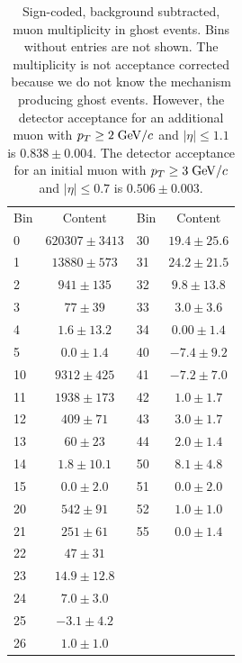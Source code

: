 \documentclass[aps,prd,preprint,floatfix,nofootinbib,superscriptaddress,showpacs,amssymb]{revtex4}
\begin{document}
 \begin{table}
 \caption[]{Sign-coded, background subtracted, muon multiplicity in
            ghost events. Bins without entries are not shown. The
            multiplicity is not acceptance corrected because we do not know
            the mechanism producing ghost events. However, the detector
            acceptance for an additional muon with $p_T\geq 2\; {\rm GeV/}c$
            and $|\eta| \leq 1.1$ is $0.838 \pm 0.004$. The detector
            acceptance for an initial muon with $p_T\geq 3 \; {\rm GeV/}c$ and
            $|\eta|\leq 0.7$ is $0.506 \pm 0.003$. }
 \begin{center}
 \begin{ruledtabular}
 \begin{tabular}{lclc}
  Bin  &            Content    & Bin    &          Content       \\
   0   &  $ 620307 \pm 3413$   &  30    &  $   19.4  \pm   25.6$ \\
   1   &  $  13880 \pm  573$   &  31    &  $   24.2  \pm   21.5$ \\
   2   &  $    941 \pm  135$   &  32    &  $    9.8  \pm   13.8$ \\
   3   &  $     77 \pm   39$   &  33    &  $    3.0  \pm    3.6$ \\
   4   &  $    1.6 \pm   13.2$ &  34    &  $    0.00 \pm    1.4$ \\
   5   &  $      0.0 \pm  1.4$ &  40    &  $   -7.4  \pm    9.2$ \\
  10   &  $  9312  \pm  425$   &  41    &  $   -7.2  \pm    7.0$ \\
  11   &  $  1938  \pm  173$   &  42    &  $    1.0  \pm    1.7$ \\
  12   &  $   409  \pm   71$   &  43    &  $    3.0  \pm    1.7$ \\
  13   &  $    60  \pm   23$   &  44    &  $    2.0  \pm    1.4$ \\
  14   &  $     1.8\pm   10.1$ &  50    &  $    8.1  \pm    4.8$ \\
  15   &  $     0.0\pm    2.0$ &  51    &  $    0.0  \pm    2.0$ \\
  20   &  $   542  \pm   91$   &  52    &  $    1.0  \pm    1.0$ \\
  21   &  $   251  \pm   61$   &  55    &  $    0.0  \pm    1.4$ \\
  22   &  $    47  \pm   31$   &        &                        \\
  23   &  $    14.9\pm   12.8$ &        &                        \\
  24   &  $     7.0\pm    3.0$ &        &                        \\
  25   &  $    -3.1\pm    4.2$ &        &                        \\
  26   &  $     1.0\pm    1.0$ &        &                        \\
 \end{tabular}
 \end{ruledtabular}
 \end{center}
 \label{tab:tab_mult}
 \end{table} 
\end{document}
